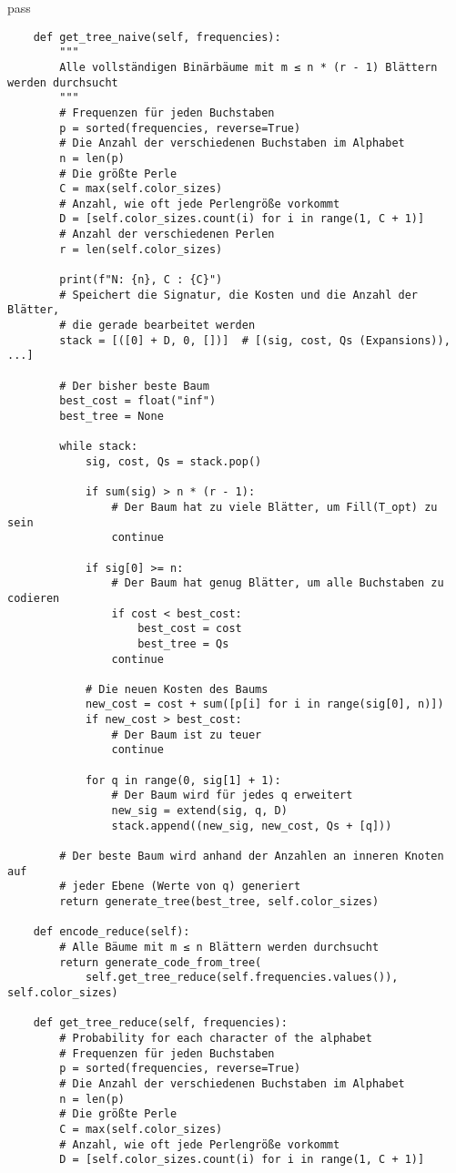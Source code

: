 pass\documentclass[a4paper,10pt,ngerman]{scrartcl}
\begin{document}
\begin{verbatim}
    def get_tree_naive(self, frequencies):
        """
        Alle vollständigen Binärbäume mit m ≤ n * (r - 1) Blättern werden durchsucht
        """
        # Frequenzen für jeden Buchstaben
        p = sorted(frequencies, reverse=True)
        # Die Anzahl der verschiedenen Buchstaben im Alphabet
        n = len(p)
        # Die größte Perle
        C = max(self.color_sizes)
        # Anzahl, wie oft jede Perlengröße vorkommt
        D = [self.color_sizes.count(i) for i in range(1, C + 1)]
        # Anzahl der verschiedenen Perlen
        r = len(self.color_sizes)

        print(f"N: {n}, C : {C}")
        # Speichert die Signatur, die Kosten und die Anzahl der Blätter,
        # die gerade bearbeitet werden
        stack = [([0] + D, 0, [])]  # [(sig, cost, Qs (Expansions)), ...]

        # Der bisher beste Baum
        best_cost = float("inf")
        best_tree = None

        while stack:
            sig, cost, Qs = stack.pop()

            if sum(sig) > n * (r - 1):
                # Der Baum hat zu viele Blätter, um Fill(T_opt) zu sein
                continue

            if sig[0] >= n:
                # Der Baum hat genug Blätter, um alle Buchstaben zu codieren
                if cost < best_cost:
                    best_cost = cost
                    best_tree = Qs
                continue

            # Die neuen Kosten des Baums
            new_cost = cost + sum([p[i] for i in range(sig[0], n)])
            if new_cost > best_cost:
                # Der Baum ist zu teuer
                continue

            for q in range(0, sig[1] + 1):
                # Der Baum wird für jedes q erweitert
                new_sig = extend(sig, q, D)
                stack.append((new_sig, new_cost, Qs + [q]))

        # Der beste Baum wird anhand der Anzahlen an inneren Knoten auf
        # jeder Ebene (Werte von q) generiert
        return generate_tree(best_tree, self.color_sizes)

    def encode_reduce(self):
        # Alle Bäume mit m ≤ n Blättern werden durchsucht
        return generate_code_from_tree(
            self.get_tree_reduce(self.frequencies.values()), self.color_sizes)

    def get_tree_reduce(self, frequencies):
        # Probability for each character of the alphabet
        # Frequenzen für jeden Buchstaben
        p = sorted(frequencies, reverse=True)
        # Die Anzahl der verschiedenen Buchstaben im Alphabet
        n = len(p)
        # Die größte Perle
        C = max(self.color_sizes)
        # Anzahl, wie oft jede Perlengröße vorkommt
        D = [self.color_sizes.count(i) for i in range(1, C + 1)]


\end{verbatim}
\end{document}
